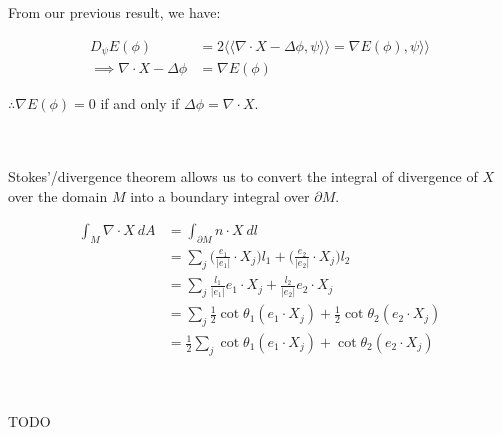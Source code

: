 \documentclass{article}
\newcommand\ifrac[2]{{\displaystyle\frac{#1}{#2}}}
\def\grad{\nabla}
\def\lap{\Delta}
\def\hal{\ifrac{1}{2}}
\def\ll{\langle\langle}
\def\rr{\rangle\rangle}
\begin{document}
\vspace{1.8cm}
\\\\


From our previous result, we have:

\begin{align*}
    D_\psi E(\phi) &= 2 \ll \grad \cdot X - \lap \phi, \psi \rr = \grad E(\phi), \psi \rr \\
    \implies \grad \cdot X - \lap \phi &= \grad E(\phi)
\end{align*}

$\therefore \grad E(\phi) = 0$ if and only if $\lap \phi = \grad \cdot X$.


\pagebreak
{}\\\\


Stokes'/divergence theorem allows us to convert the integral of divergence of $X$ over the domain $M$
into a boundary integral over $\partial M$.

\begin{align*}
    \int_M \nabla \cdot X \ dA &= \int_{\partial M} n \cdot X \ dl \\
        &= \sum_{j} \Big(\frac{e_1}{| e_1 |} \cdot X_j \Big) l_1 +\Big(\frac{e_2}{| e_2 |} \cdot X_j \Big) l_2 \\
        &= \sum_{j} \frac{l_1}{| e_1 |} e_1 \cdot X_j + \frac{l_2}{| e_2 |} e_2 \cdot X_j \\
        &= \sum_{j} \hal \cot{\theta_1} (e_1 \cdot X_j) + \hal \cot{\theta_2} (e_2 \cdot X_j) \\
        &= \hal \sum_{j} \cot{\theta_1} (e_1 \cdot X_j) + \cot{\theta_2} (e_2 \cdot X_j)
\end{align*}


\vspace{1.8cm}
\\\\
TODO
\end{document}
